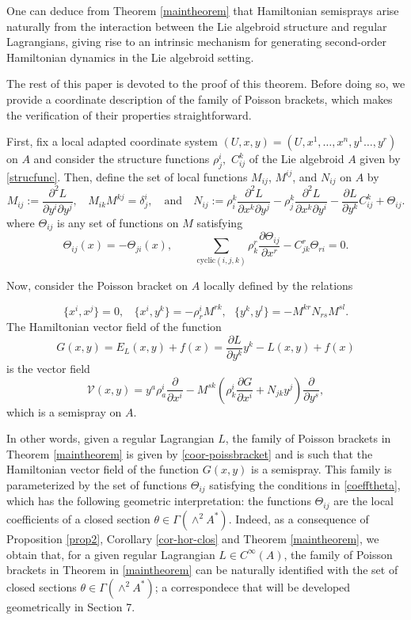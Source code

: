 \documentclass[12pt,letterpaper]{article}
\numberwithin{equation}{section}
\begin{document}
One can deduce from Theorem \ref{maintheorem} that Hamiltonian semisprays arise naturally 
from the interaction between the Lie algebroid structure and regular Lagrangians,
giving rise to an intrinsic mechanism for generating second-order Hamiltonian dynamics in the Lie algebroid setting.

The rest of this paper is devoted to the proof of this theorem. 
Before doing so, we provide a coordinate description of the family of Poisson brackets, 
which makes the verification of their properties straightforward.

First, fix a local adapted coordinate system  $(U, x, y)=(U, x^1,\ldots,x^n,y^1\ldots,y^r)$ on $ A$ 
and consider the structure functions $\rho_j^{i},$ $C_{ij}^k$ of the Lie algebroid $A$ given by \eqref{strucfunc}.
Then, define the set of local functions ${M_{ij}}$, $M^{ij}$, and $N_{ij}$ on $A$ by
\[
M_{ij}:=\frac{\partial^2 L}{\partial y^{i}\partial y^{j}}, \ \ \ \   M_{ik}M^{kj}=\delta^{i}_j, 
\quad\text{and}\quad
N_{ij} := \rho_i^{k}\frac{\partial^2 L}{\partial x^{k}\partial y^{j}}-\rho_j^{k}\frac{\partial^2 L}{\partial x^{k}\partial y^{i}}-\frac{\partial L}{\partial y^k}C^k_{ij} + \Theta_{ij}. 
\]
where $\Theta_{ij}$ is any set of functions on $M$ satisfying
\begin{equation}\label{coefftheta}
  \Theta_{ij}(x)=-\Theta_{ji}(x), \qquad  \sum_{\mathrm{cyclic}(i,j,k)}\rho^r_k\frac{\partial \Theta_{ij}}{\partial x^r}-C^r_{jk}\Theta_{ri}=0.
\end{equation}

Now, consider the Poisson bracket on $A$ locally defined by the relations

\begin{equation}\label{coor-poissbracket}
\{  x^{i},x^{j} \}=0  ,\ \ \ \  \{  x^{i},y^{k} \}= -\rho^{i}_rM^{rk} ,\ \ \    \{  y^{k},y^{l} \}= -M^{kr}N_{rs}M^{sl}.
\end{equation}
The Hamiltonian vector field of the function
$$G(x,y)= E_L(x,y) +f(x)  = \frac{\partial L}{\partial y^k}y^k-L(x,y) + f(x) $$
is the vector field
\[
\mathcal{V}(x,y) = y^a \rho^i_a \frac{\partial}{\partial x^i} - M^{sk}\left( \rho^i_k \frac{\partial G}{\partial x^i} + N_{jk} y^j \right) \frac{\partial}{\partial y^s},
\]
which is a semispray on $A$.

In other words, given a regular Lagrangian $L$, the family of Poisson brackets in Theorem \ref{maintheorem} is given by \eqref{coor-poissbracket} 
and is such that the Hamiltonian vector field of the function $G(x,y)$ is a semispray.
This family is parameterized by the set of functions $\Theta_{ij}$ satisfying the conditions in \eqref{coefftheta}, 
which has the following geometric interpretation: 
the functions $\Theta_{ij}$ are the local coefficients of a closed section $\theta\in \Gamma(\wedge^2 A^*)$.
Indeed, as a consequence of Proposition \ref{prop2}, Corollary \ref{cor-hor-clos} and Theorem \ref{maintheorem}, we obtain that, 
for a given regular Lagrangian $L \in C^{\infty}(A)$, the family of Poisson brackets in Theorem  in \ref{maintheorem}  
can be naturally identified with the set of closed sections $\theta\in \Gamma(\wedge^2 A^*)$;
a correspondece that will be developed geometrically in Section 7.
\end{document}
